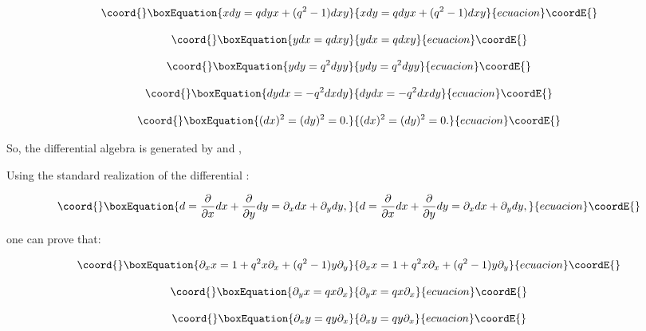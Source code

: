 \documentclass[a4paper,12pt,thmsa]{article}
\begin{document}
\begin{equation}\coord{}\boxEquation{
xdy=qdyx+(q^2-1)dxy
}{
xdy=qdyx+(q^2-1)dxy
}{ecuacion}\coordE{}\end{equation}

\begin{equation}\coord{}\boxEquation{
ydx=qdxy
}{
ydx=qdxy
}{ecuacion}\coordE{}\end{equation}

\begin{equation}\coord{}\boxEquation{
ydy=q^2dyy
}{
ydy=q^2dyy
}{ecuacion}\coordE{}\end{equation}

\begin{equation}\coord{}\boxEquation{
dydx=-q^2dxdy
}{
dydx=-q^2dxdy
}{ecuacion}\coordE{}\end{equation}

\begin{equation}\coord{}\boxEquation{
(dx)^2=(dy)^2=0.
}{
(dx)^2=(dy)^2=0.
}{ecuacion}\coordE{}\end{equation}

So, the differential algebra \myHighlight{$\Omega $}\coordHE{} is generated by \coordHE{}  \coordHE{}  \coordHE{} and \coordHE{}, \coordHE{}

Using the standard realization of the differential \coordHE{}:

\begin{equation}\coord{}\boxEquation{
d=\frac \partial {\partial x}dx+\frac \partial {\partial y}dy=\partial
_xdx+\partial _ydy,
}{
d=\frac \partial {\partial x}dx+\frac \partial {\partial y}dy=\partial
_xdx+\partial _ydy,
}{ecuacion}\coordE{}\end{equation}

one can prove that:

\begin{equation}\coord{}\boxEquation{
\partial _xx=1+q^2x\partial _x+(q^2-1)y\partial _y
}{
\partial _xx=1+q^2x\partial _x+(q^2-1)y\partial _y
}{ecuacion}\coordE{}\end{equation}

\begin{equation}\coord{}\boxEquation{
\partial _yx=qx\partial _x
}{
\partial _yx=qx\partial _x
}{ecuacion}\coordE{}\end{equation}

\begin{equation}\coord{}\boxEquation{
\partial _xy=qy\partial _x
}{
\partial _xy=qy\partial _x
}{ecuacion}\coordE{}\end{equation}
\end{document}
